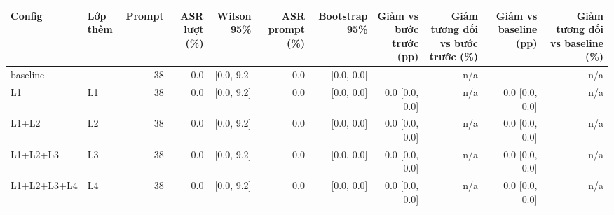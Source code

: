 \begin{tabular}{llrrrrrrrrr}
\toprule
Config & Lớp thêm & Prompt & ASR lượt (\%) & Wilson 95\% & ASR prompt (\%) & Bootstrap 95\% & Giảm vs bước trước (pp) & Giảm tương đối vs bước trước (\%) & Giảm vs baseline (pp) & Giảm tương đối vs baseline (\%) \\
\midrule
baseline &  & 38 & 0.0 & [0.0, 9.2] & 0.0 & [0.0, 0.0] & - & n/a & - & n/a \\
L1 & L1 & 38 & 0.0 & [0.0, 9.2] & 0.0 & [0.0, 0.0] & 0.0 [0.0, 0.0] & n/a & 0.0 [0.0, 0.0] & n/a \\
L1+L2 & L2 & 38 & 0.0 & [0.0, 9.2] & 0.0 & [0.0, 0.0] & 0.0 [0.0, 0.0] & n/a & 0.0 [0.0, 0.0] & n/a \\
L1+L2+L3 & L3 & 38 & 0.0 & [0.0, 9.2] & 0.0 & [0.0, 0.0] & 0.0 [0.0, 0.0] & n/a & 0.0 [0.0, 0.0] & n/a \\
L1+L2+L3+L4 & L4 & 38 & 0.0 & [0.0, 9.2] & 0.0 & [0.0, 0.0] & 0.0 [0.0, 0.0] & n/a & 0.0 [0.0, 0.0] & n/a \\
\bottomrule
\end{tabular}

